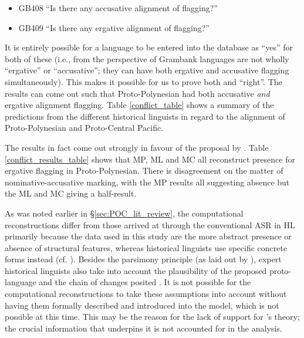 \documentclass[12pt,letterpaper]{article}
\begin{document}
\begin{itemize}
\item GB408 ``Is there any accusative alignment of flagging?''
\item GB409 ``Is there any ergative alignment of flagging?''
\end{itemize}

It is entirely possible for a language to be entered into the database as ``yes'' for both of these (i.e., from the perspective of Grambank languages are not wholly ``ergative'' or ``accusative''; they can have both ergative and accusative flagging simultaneously). This makes it possible for us to prove both \citet{chung1978} and \citet{clark1973aspects} ``right''. The results can come out such that Proto-Polynesian had both accusative \textit{and} ergative alignment flagging. Table \ref{conflict_table} shows a summary of the predictions from the different historical linguists in regard to the alignment of Proto-Polynesian and Proto-Central Pacific.

\newcommand{\pb}[1]{\parbox[t][][t]{1\linewidth}{#1} \vspace{3.5pt}}



The results in fact come out strongly in favour of the proposal by \citeauthor{clark1973aspects}. Table \ref{conflict_results_table} shows that MP, ML and MC all reconstruct presence for ergative flagging in Proto-Polynesian. There is disagreement on the matter of nominative-accusative marking, with the MP results all suggesting absence but the ML and MC giving a half-result.




As was noted earlier in §\ref{sec:POC_lit_review}, the computational reconstructions differ from those arrived at through the conventional ASR in HL primarily because the data used in this study are the more abstract presence or absence of structural features, whereas historical linguists use specific concrete forms instead (cf. \citealt{crowley1985common}). Besides the parsimony principle (as laid out by \citealt[19]{clark1973aspects}), expert historical linguists also take into account the plausibility of the proposed proto-language and the chain of changes posited \citep{chung1977aspects}. It is not possible for the computational reconstructions to take these assumptions into account without having them formally described and introduced into the model, which is not possible at this time. This may be the reason for the lack of support for \citeauthor{chung1977aspects}'s theory; the crucial information that underpins it is not accounted for in the analysis.
\end{document}
